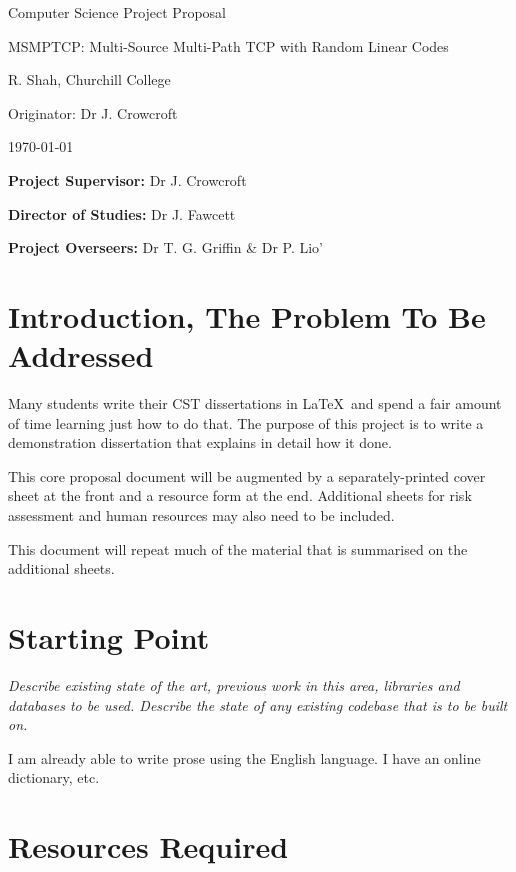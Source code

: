 \documentclass[12pt,a4paper,twoside]{article}
\begin{document}
\vfil

\centerline{\Large Computer Science Project Proposal}
\vspace{0.4in}
\centerline{\Large MSMPTCP: Multi-Source Multi-Path TCP with Random Linear Codes}
\vspace{0.4in}
\centerline{\large R. Shah, Churchill College}
\vspace{0.3in}
\centerline{\large Originator: Dr J. Crowcroft}
\vspace{0.3in}
\centerline{\large \today}

\vfil


\noindent
{\bf Project Supervisor:} Dr J. Crowcroft
\vspace{0.2in}

\noindent
{\bf Director of Studies:} Dr J. Fawcett
\vspace{0.2in}
\noindent
 
\noindent
{\bf Project Overseers:} Dr T. G. Griffin  \& Dr P. Lio'



\section*{Introduction, The Problem To Be Addressed}


Many students write their CST dissertations in \LaTeX\ and spend a
fair amount of time learning just how to do that. The purpose of this
project is to write a demonstration dissertation that explains in
detail how it done.

This core proposal document will be augmented by a separately-printed
cover sheet at the front and a resource form at the end. Additional
sheets for risk assessment and human resources may also need to be
included.

This document will repeat much of the material that is summarised on
the additional sheets.

\section*{Starting Point}

{\em Describe existing state of the art, previous work in this area,
  libraries and databases to be used. Describe the state of any
  existing codebase that is to be built on. }

I am already able to write prose using the English language. I have an
online dictionary, etc.

\section*{Resources Required}
\end{document}
